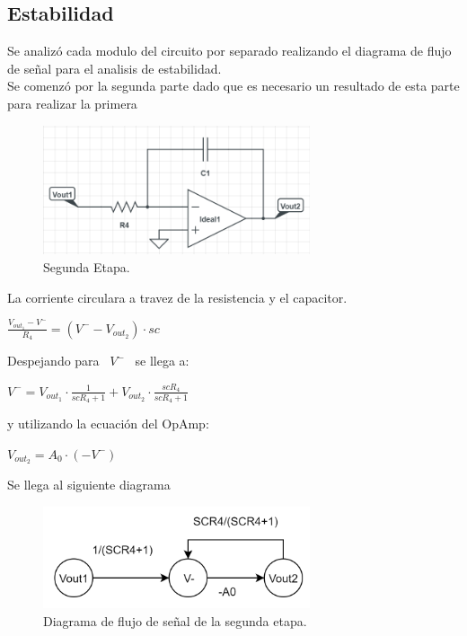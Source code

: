 \documentclass[a4paper]{article}
\begin{document}
\subsection{Estabilidad}
Se analizó cada modulo del circuito por separado realizando el diagrama de flujo de señal para el analisis de estabilidad.\\
Se comenzó por la segunda parte dado que es necesario un resultado de esta parte para realizar la primera

\begin{figure}[htb]	
	\centering
	\includegraphics[width=0.7\textwidth]{imagenes/SegundaEtapa.PNG}
	\caption{Segunda Etapa.}
	\label{fig:SegundaEtapa}
\end{figure}
La corriente circulara a travez de la resistencia y el capacitor.\\
\begin{center}
$ \frac{V_{out_1}-V^-}{R_4} = (V^--V_{out_2})\cdot sc$ \\
\end{center}
 Despejando para \ $V^-$ \ se llega a: \\
\begin{center}
$V^- = V_{out_1} \cdot \frac{1}{scR_4+1}+V_{out_2} \cdot \frac{scR_4}{scR_4+1}$\\\end{center}
y utilizando la ecuación del OpAmp:\\
\begin{center}
$V_{out_2}=A_0 \cdot (-V^-)$
\end{center}
Se llega al siguiente diagrama
\begin{figure}[H]	
	\centering
	\includegraphics[width=0.7\textwidth]{imagenes/SegundaEtapaDiagrama.PNG}
	\caption{Diagrama de flujo de señal de la segunda etapa.}
	\label{fig:SegundaEtapaDiagrama}
\end{figure}
\end{document}
